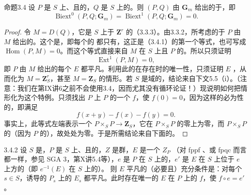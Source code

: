 \begin{SGAresult}{命题}{3.4}
设 $P$ 是 $S$ 上、且的，$Q$ 是 $S$ 上的。则 $(P,Q)$ 由 $\mathbf G_m$ 给出的于，即
\[
\operatorname{Biext}^0(P,Q;\mathbf G_m)=\operatorname{Biext}^1(P,Q;\mathbf G_m)=0.\tag{3.4.1}
\]
\end{SGAresult}
\begin{proof}
令 $M=D(Q)$，它是 $S$ 上于 $\mathbf Z^r$ 的（3.3.3）。由3.3.2，所考虑的于 $P$ 由 $M$ 给出的。这个是，即每个的
都只有，这正是（3.4.1）的第一个等式，也可写成 $\operatorname{Hom}(P,M)=0$。而这个等式直接来自 $M$ 在 $S$ 上且 $P$ 的。所以只须证明
\[\operatorname{Ext}^1(P,M)=0,\]
即 $P$ 由 $M$ 给出的每个 $E$ 都平凡。利用此的在存在时的唯一性，只须证明 $E$ ，从而化为 $M=\mathbf Z_S^r$，甚至 $M=\mathbf Z_S$ 的情形。若 $S$ 是域的，结论来自下文5.5（i）。（注意：我们在第IX讲6之前不会使用3.4，因而尤其没有循环论证！）现说明如何把情形化为这个特例。只须找出 $P$ 上 $P$ 的一个 $f$，使 $f(0)=0$，因为这样的必为性的，即满足
\[f(x+y)-f(x)-f(y)=0.\]
事实上，此等式左端表示一个 $P\times_SP\to\mathbf Z_S$，它在 $P\times_SP$ 的零上为零，而 $P\times_SP$ 的（因为 $P$ 的），故处处为零。于是所需结论来自下面的。
\end{proof}
\begin{SGAresult}{}{3.4.2}
设 $S$ 是，$P$ 是 $S$ 上、且的，$Z$ 是群，$E$ 是一个 $Z_P$ （对 fppf 、或 fpqc 而言都一样，参见 SGA 3，第X讲5.4等），$e$ 是 $P$ 在 $S$ 上的，$e'$ 是 $E$ 在 $S$ 上位于 $e$ 上方的（即 $e^{-1}(E)$ 在 $S$ 上的）。
则 $E$ 平凡的（必要且）充分条件是：对每个 $s\in S$，诱导的 $P_s$ 上的 $E_s$ 都平凡。此时存在唯一的 $E$ 在 $P$ 上的 $f$，使 $f\circ e=e'$。
\end{SGAresult}
